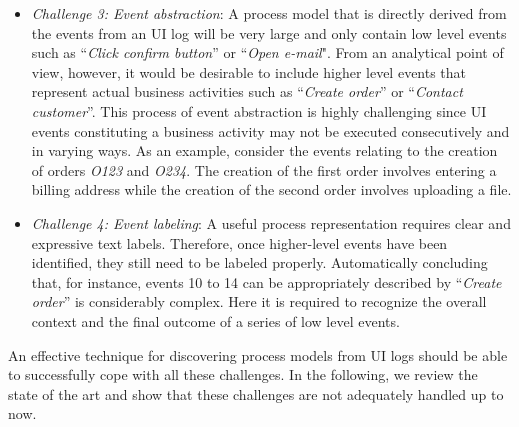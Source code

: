 \begin{itemize}
\item \textit{Challenge 3: Event abstraction}: A process model that is directly derived from the events from an UI log will be very large and only contain low level events such as ``\textit{Click confirm button}'' or ``\textit{Open e-mail}". From an analytical point of view, however,  it would be desirable to include higher level events that represent actual business activities such as ``\textit{Create order}'' or ``\textit{Contact customer}''. This process of event abstraction is highly challenging since UI events constituting a business activity may not be executed consecutively and in varying ways. As an example, consider the events relating to the creation of orders \textit{O123} and \textit{O234}. The creation of the first order involves entering a billing address while the creation of the second order involves uploading a file. 

\item \textit{Challenge 4: Event labeling}: A useful process representation requires clear and expressive text labels. Therefore, once higher-level events have been identified, they still need to be labeled properly. Automatically concluding that, for instance, events 10 to 14 can be appropriately described by ``\textit{Create order}'' is considerably complex. Here it is required to recognize the overall context and the final outcome of a series of low level events.  
 \end{itemize}

An effective technique for discovering process models from UI logs should be able to successfully cope with all these challenges. In the following, we review the state of the art and show that these challenges are not adequately handled up to now. 